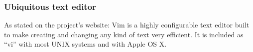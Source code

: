 \begin{frame}[fragile]
  \frametitle{Ubiquitous text editor}
  As stated on the project's website:
  \vspace{1cm}
  Vim is a highly configurable text editor built to make creating and changing
  any kind of text very efficient. It is included as ``vi'' with most UNIX
  systems and with Apple OS X.
\end{frame}
